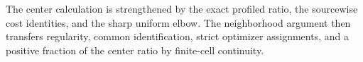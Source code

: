 The center calculation is strengthened by the exact profiled ratio, the sourcewise cost identities, and the sharp uniform elbow. The neighborhood argument then transfers regularity, common identification, strict optimizer assignments, and a positive fraction of the center ratio by finite-cell continuity.